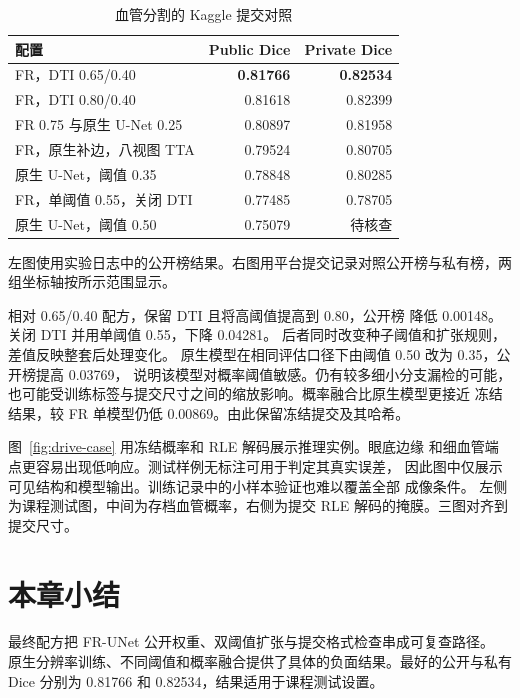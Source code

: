 \begin{table}[H]
\centering\small
\caption{血管分割的 Kaggle 提交对照}\label{tab:drive-results}
\begin{tabularx}{\linewidth}{@{}Yrr@{}}
\toprule
配置 & Public Dice & Private Dice \\
\midrule
FR，DTI 0.65/0.40 & \textbf{0.81766} & \textbf{0.82534} \\
FR，DTI 0.80/0.40 & 0.81618 & 0.82399 \\
FR 0.75 与原生 U-Net 0.25 & 0.80897 & 0.81958 \\
FR，原生补边，八视图 TTA & 0.79524 & 0.80705 \\
原生 U-Net，阈值 0.35 & 0.78848 & 0.80285 \\
FR，单阈值 0.55，关闭 DTI & 0.77485 & 0.78705 \\
原生 U-Net，阈值 0.50 & 0.75079 & 待核查 \\
\bottomrule
\end{tabularx}
\end{table}
{左图使用实验日志中的公开榜结果。右图用平台提交记录对照公开榜与私有榜，两组坐标轴按所示范围显示。}

相对 0.65/0.40 配方，保留 DTI 且将高阈值提高到 0.80，公开榜
降低 0.00148。关闭 DTI 并用单阈值 0.55，下降 0.04281。
后者同时改变种子阈值和扩张规则，差值反映整套后处理变化。
原生模型在相同评估口径下由阈值 0.50 改为 0.35，公开榜提高 0.03769，
说明该模型对概率阈值敏感。仍有较多细小分支漏检的可能，
也可能受训练标签与提交尺寸之间的缩放影响。概率融合比原生模型更接近
冻结结果，较 FR 单模型仍低 0.00869。由此保留冻结提交及其哈希。

\ifLocalReport 图~\ref{fig:drive-case} 用冻结概率和 RLE 解码展示推理实例。眼底边缘
和细血管端点更容易出现低响应。测试样例无标注可用于判定其真实误差，
因此图中仅展示可见结构和模型输出。训练记录中的小样本验证也难以覆盖全部
成像条件。\fi
{}
{左侧为课程测试图，中间为存档血管概率，右侧为提交 RLE 解码的掩膜。三图对齐到提交尺寸。}

\section{本章小结}
最终配方把 FR-UNet 公开权重、双阈值扩张与提交格式检查串成可复查路径。
原生分辨率训练、不同阈值和概率融合提供了具体的负面结果。最好的公开与私有
Dice 分别为 0.81766 和 0.82534，结果适用于课程测试设置。
